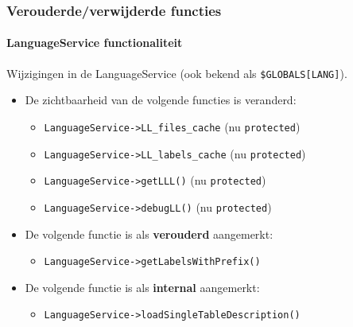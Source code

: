 \begin{frame}[fragile]
	\frametitle{Verouderde/verwijderde functies}
	\framesubtitle{LanguageService functionaliteit}

	Wijzigingen in de LanguageService (ook bekend als \texttt{\$GLOBALS[LANG]}).
	\vspace{0.4cm}
	\begin{itemize}
		\item De zichtbaarheid van de volgende functies is veranderd:
			\begin{itemize}\smaller
				\item \texttt{LanguageService->LL\_files\_cache} (nu \texttt{protected})
				\item \texttt{LanguageService->LL\_labels\_cache} (nu \texttt{protected})
				\item \texttt{LanguageService->getLLL()} (nu \texttt{protected})
				\item \texttt{LanguageService->debugLL()} (nu \texttt{protected})
			\end{itemize}\normalsize
			\vspace{0.2cm}

		\item De volgende functie is als \textbf{verouderd} aangemerkt:
			\begin{itemize}\smaller
				\item \texttt{LanguageService->getLabelsWithPrefix()}
			\end{itemize}\normalsize
			\vspace{0.2cm}

		\item De volgende functie is als \textbf{internal} aangemerkt:
			\begin{itemize}\smaller
				\item \texttt{LanguageService->loadSingleTableDescription()}
			\end{itemize}\normalsize
			\vspace{0.2cm}

	\end{itemize}

\end{frame}


